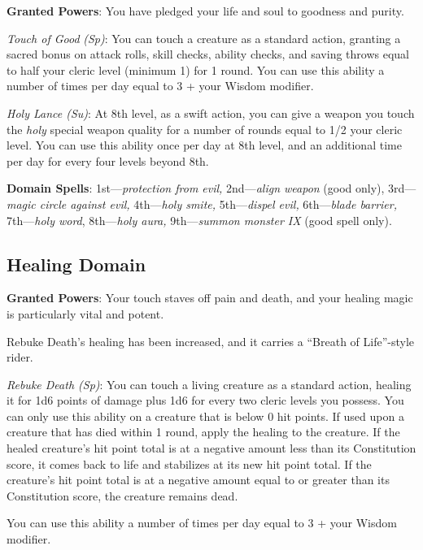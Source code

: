 				
\textbf{Granted Powers}: You have pledged your life and soul to goodness and purity.
				
\textit{Touch of Good} \textit{(Sp)}: You can touch a creature as a standard action, granting a sacred bonus on 
attack rolls, skill checks, ability checks, and saving throws equal to half your cleric level (minimum 1) for 1 
round. You can use this ability a number of times per day equal to 3 + your Wisdom modifier.
				
\textit{Holy Lance (Su)}: At 8th level, as a swift action, you can give a weapon you touch the\textit{ holy }
special weapon quality for a number of rounds equal to 1/2 your cleric level. You can use this ability once per
day at 8th level, and an additional time per day for every four levels beyond 8th.
				
\textbf{Domain Spells}: 1st---\textit{protection from evil, }2nd---\textit{align weapon }(good only), 3rd---\textit{magic circle against evil, }4th---\textit{holy smite, }5th---\textit{dispel evil, }6th---\textit{blade barrier, }7th---\textit{holy word}, 8th---\textit{holy aura, }9th---\textit{summon monster IX} (good spell only).
				
\subsection{Healing Domain}

\textbf{Granted Powers}: Your touch staves off pain and death, and your healing magic is particularly vital and
potent.

\begin{formal}
 Rebuke Death's healing has been increased, and it carries a ``Breath of Life''-style rider.
\end{formal}

\textit{Rebuke Death (Sp)}: You can touch a living creature as a standard action, healing it for 1d6 points of
damage plus 1d6 for every two cleric levels you possess. You can only use this ability on a creature that is below
0 hit points. If used upon a creature that has died within 1 round, apply the healing to the creature. If the
healed creature's hit point total is at a negative amount less than its Constitution score, it comes back to life
and stabilizes at its new hit point total. If the creature's hit point total is at a negative amount equal to or
greater than its Constitution score, the creature remains dead.

You can use this ability a number of times per day equal to 3 + your Wisdom modifier.


